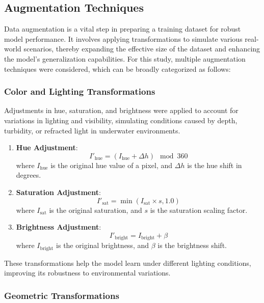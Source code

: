 \documentclass[conference]{IEEEtran}
\begin{document}
\subsection{Augmentation Techniques}

Data augmentation is a vital step in preparing a training dataset for robust model performance. It involves applying transformations to simulate various real-world scenarios, thereby expanding the effective size of the dataset and enhancing the model's generalization capabilities. For this study, multiple augmentation techniques were considered, which can be broadly categorized as follows:

\subsubsection{Color and Lighting Transformations}

Adjustments in hue, saturation, and brightness were applied to account for variations in lighting and visibility, simulating conditions caused by depth, turbidity, or refracted light in underwater environments.

\begin{enumerate}
    \item \textbf{Hue Adjustment}:
    \[
    I'_{\text{hue}} = (I_{\text{hue}} + \Delta h) \mod 360
    \]
    where \( I_{\text{hue}} \) is the original hue value of a pixel, and \( \Delta h \) is the hue shift in degrees.

    \item \textbf{Saturation Adjustment}:
    \[
    I'_{\text{sat}} = \min(I_{\text{sat}} \times s, 1.0)
    \]
    where \( I_{\text{sat}} \) is the original saturation, and \( s \) is the saturation scaling factor.

    \item \textbf{Brightness Adjustment}:
    \[
    I'_{\text{bright}} = I_{\text{bright}} + \beta
    \]
    where \( I_{\text{bright}} \) is the original brightness, and \( \beta \) is the brightness shift.
\end{enumerate}

These transformations help the model learn under different lighting conditions, improving its robustness to environmental variations.

\subsubsection{Geometric Transformations}
\end{document}
